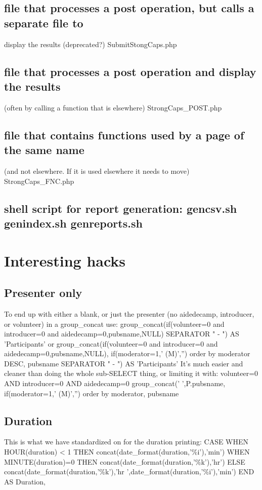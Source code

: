 \documentclass[captions=tablesignature]{scrartcl}
\begin{document}
\subsection{file that processes a post operation, but calls a separate file to}
\label{sec-1-6}
display the results (deprecated?)
SubmitStongCaps.php
\subsection{file that processes a post operation and display the results}
\label{sec-1-7}
(often by calling a function that is elsewhere)
StrongCaps\_POST.php
\subsection{file that contains functions used by a page of the same name}
\label{sec-1-8}
(and not elsewhere.   If it is used elsewhere it needs to move)
StrongCaps\_FNC.php
\subsection{shell script for report generation: gencsv.sh genindex.sh genreports.sh}
\label{sec-1-9}

\section{Interesting hacks}
\label{sec-2}
\subsection{Presenter only}
\label{sec-2-1}
To end up with either a blank, or just the presenter (no aidedecamp, introducer, or volunteer) in a group\_concat use:
group\_concat(if(volunteer=0 and introducer=0 and aidedecamp=0,pubsname,NULL) SEPARATOR " - ") AS 'Participants' or
group\_concat(if(volunteer=0 and introducer=0 and aidedecamp=0,pubsname,NULL), if(moderator=1,' (M)','') order by moderator DESC, pubsname SEPARATOR " - ") AS 'Participants'
It's much easier and cleaner than doing the whole sub-SELECT thing, or limiting it with:
volunteer=0 AND introducer=0 AND aidedecamp=0
group\_concat(' ',P.pubsname, if(moderator=1,'  (M)','') order by moderator, pubsname

\subsection{Duration}
\label{sec-2-2}
This is what we have standardized on for the duration printing:
 CASE
   WHEN HOUR(duration) < 1 THEN
     concat(date\_format(duration,'\%i'),'min')
   WHEN MINUTE(duration)=0 THEN
     concat(date\_format(duration,'\%k'),'hr')
   ELSE
     concat(date\_format(duration,'\%k'),'hr ',date\_format(duration,'\%i'),'min')
   END AS Duration,
\end{document}
